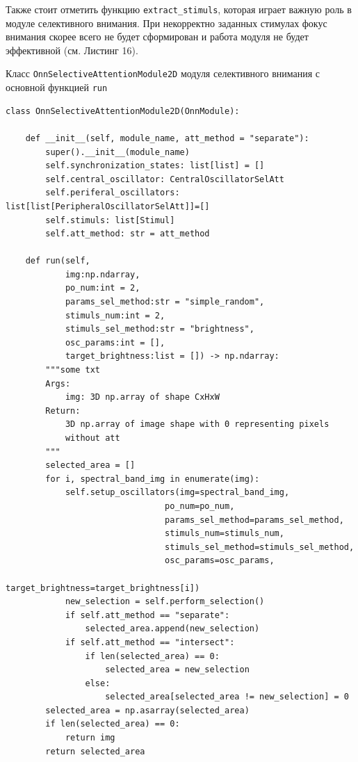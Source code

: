 \documentclass[14pt, russian]{scrartcl}
\begin{document}
Также стоит отметить функцию \texttt{extract\_stimuls}, которая играет важную роль в модуле селективного внимания. При некорректно заданных 
стимулах фокус внимания скорее всего не будет сформирован и работа модуля не будет эффективной (см. Листинг 16).

\begin{listing}[H]
    \caption{Класс \texttt{OnnSelectiveAttentionModule2D} модуля селективного внимания с основной функцией \texttt{run}}
    \label{lst:hyp_data}
    \begin{verbatim}
class OnnSelectiveAttentionModule2D(OnnModule):

    def __init__(self, module_name, att_method = "separate"):
        super().__init__(module_name)
        self.synchronization_states: list[list] = []
        self.central_oscillator: CentralOscillatorSelAtt
        self.periferal_oscillators: list[list[PeripheralOscillatorSelAtt]]=[]
        self.stimuls: list[Stimul]
        self.att_method: str = att_method

    def run(self, 
            img:np.ndarray, 
            po_num:int = 2, 
            params_sel_method:str = "simple_random",
            stimuls_num:int = 2,
            stimuls_sel_method:str = "brightness",
            osc_params:int = [],
            target_brightness:list = []) -> np.ndarray:
        """some txt
        Args:
            img: 3D np.array of shape CxHxW
        Return:
            3D np.array of image shape with 0 representing pixels 
            without att
        """
        selected_area = []
        for i, spectral_band_img in enumerate(img):
            self.setup_oscillators(img=spectral_band_img, 
                                po_num=po_num, 
                                params_sel_method=params_sel_method,
                                stimuls_num=stimuls_num,
                                stimuls_sel_method=stimuls_sel_method,
                                osc_params=osc_params,
                                target_brightness=target_brightness[i])
            new_selection = self.perform_selection()
            if self.att_method == "separate":
                selected_area.append(new_selection)
            if self.att_method == "intersect":
                if len(selected_area) == 0:
                    selected_area = new_selection
                else:
                    selected_area[selected_area != new_selection] = 0
        selected_area = np.asarray(selected_area)
        if len(selected_area) == 0:
            return img
        return selected_area
    \end{verbatim}
\end{listing}
\end{document}
